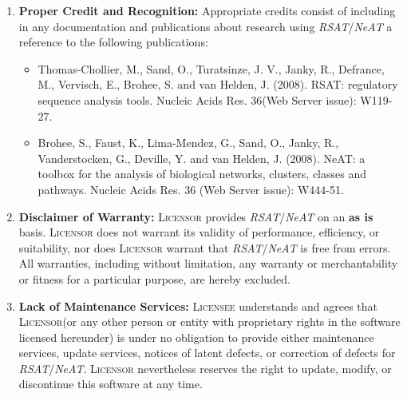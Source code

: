 \documentclass[12pt]{article}
\newcommand{\RSAT}[0]{\emph{RSAT}\xspace}
\newcommand{\NeAT}[0]{\emph{NeAT}\xspace}
\newcommand{\Licensor}[0]{\textsc{Licensor}\xspace}
\newcommand{\Licensee}[0]{\textsc{Licensee}\xspace}
\newcommand{\Paragraph}[2]{\item \textbf{#1:} #2}
\begin{document}
\begin{enumerate}
  \Paragraph{Proper Credit and Recognition}{Appropriate credits consist 
    of including in any documentation and publications about research
    using \RSAT/\NeAT a reference to the following publications: 

    \begin{itemize}

    \item [\RSAT] Thomas-Chollier, M., Sand, O., Turatsinze, J. V., Janky, R.,
      Defrance, M., Vervisch, E., Brohee, S. and van Helden,
      J. (2008). RSAT: regulatory sequence analysis tools. Nucleic Acids
      Res. 36(Web Server issue): W119-27.  

    \item [\NeAT]  Brohee, S., Faust, K., Lima-Mendez, G., Sand, O., Janky, R., Vanderstocken, G., 
      Deville, Y. and van Helden, J. (2008). NeAT: a toolbox for the analysis of biological
      networks, clusters, classes and pathways. Nucleic Acids Res. 36 (Web Server issue): 
      W444-51.
    \end{itemize}
  }

  \Paragraph{Disclaimer of Warranty}{\Licensor provides \RSAT/\NeAT on
    an \textbf{as is} basis. \Licensor does not warrant its validity
    of performance, efficiency, or suitability, nor does \Licensor
    warrant that \RSAT/\NeAT is free from errors. All warranties,
    including without limitation, any warranty or merchantability or
    fitness for a particular purpose, are hereby excluded.  }

  \Paragraph{Lack of Maintenance Services}{\Licensee understands and
    agrees that \Licensor (or any other person or entity with
    proprietary rights in the software licensed hereunder) is under no
    obligation to provide either maintenance services, update
    services, notices of latent defects, or correction of defects for
    \RSAT/\NeAT.  \Licensor nevertheless reserves the right to update,
    modify, or discontinue this software at any time.  }


\end{enumerate}
\end{document}
